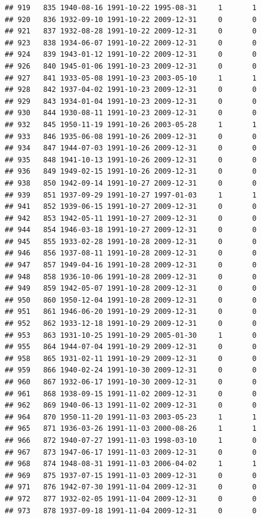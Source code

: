 \documentclass[
]{book}
\begin{document}
\begin{verbatim}
## 919   835 1940-08-16 1991-10-22 1995-08-31     1       1
## 920   836 1932-09-10 1991-10-22 2009-12-31     0       0
## 921   837 1932-08-28 1991-10-22 2009-12-31     0       0
## 923   838 1934-06-07 1991-10-22 2009-12-31     0       0
## 924   839 1943-01-12 1991-10-22 2009-12-31     0       0
## 926   840 1945-01-06 1991-10-23 2009-12-31     0       0
## 927   841 1933-05-08 1991-10-23 2003-05-10     1       1
## 928   842 1937-04-02 1991-10-23 2009-12-31     0       0
## 929   843 1934-01-04 1991-10-23 2009-12-31     0       0
## 930   844 1930-08-11 1991-10-23 2009-12-31     0       0
## 932   845 1950-11-19 1991-10-26 2003-05-28     1       1
## 933   846 1935-06-08 1991-10-26 2009-12-31     0       0
## 934   847 1944-07-03 1991-10-26 2009-12-31     0       0
## 935   848 1941-10-13 1991-10-26 2009-12-31     0       0
## 936   849 1949-02-15 1991-10-26 2009-12-31     0       0
## 938   850 1942-09-14 1991-10-27 2009-12-31     0       0
## 939   851 1937-09-29 1991-10-27 1997-01-03     1       1
## 941   852 1939-06-15 1991-10-27 2009-12-31     0       0
## 942   853 1942-05-11 1991-10-27 2009-12-31     0       0
## 944   854 1946-03-18 1991-10-27 2009-12-31     0       0
## 945   855 1933-02-28 1991-10-28 2009-12-31     0       0
## 946   856 1937-08-11 1991-10-28 2009-12-31     0       0
## 947   857 1949-04-16 1991-10-28 2009-12-31     0       0
## 948   858 1936-10-06 1991-10-28 2009-12-31     0       0
## 949   859 1942-05-07 1991-10-28 2009-12-31     0       0
## 950   860 1950-12-04 1991-10-28 2009-12-31     0       0
## 951   861 1946-06-20 1991-10-29 2009-12-31     0       0
## 952   862 1933-12-18 1991-10-29 2009-12-31     0       0
## 953   863 1931-10-25 1991-10-29 2005-01-30     1       0
## 955   864 1944-07-04 1991-10-29 2009-12-31     0       0
## 958   865 1931-02-11 1991-10-29 2009-12-31     0       0
## 959   866 1940-02-24 1991-10-30 2009-12-31     0       0
## 960   867 1932-06-17 1991-10-30 2009-12-31     0       0
## 961   868 1938-09-15 1991-11-02 2009-12-31     0       0
## 962   869 1940-06-13 1991-11-02 2009-12-31     0       0
## 964   870 1950-11-20 1991-11-03 2003-05-23     1       1
## 965   871 1936-03-26 1991-11-03 2000-08-26     1       1
## 966   872 1940-07-27 1991-11-03 1998-03-10     1       0
## 967   873 1947-06-17 1991-11-03 2009-12-31     0       0
## 968   874 1948-08-31 1991-11-03 2006-04-02     1       1
## 969   875 1937-07-15 1991-11-03 2009-12-31     0       0
## 971   876 1942-07-30 1991-11-04 2009-12-31     0       0
## 972   877 1932-02-05 1991-11-04 2009-12-31     0       0
## 973   878 1937-09-18 1991-11-04 2009-12-31     0       0

\end{verbatim}
\end{document}
